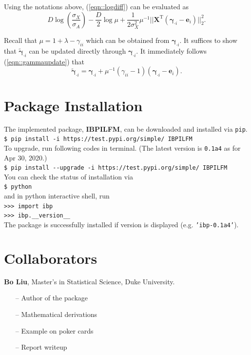 \documentclass{article}
\newcommand{\shellcmd}[1]{\\\indent\indent\texttt{\footnotesize\$ #1}\\}
\newcommand{\pythoncmd}[1]{\\\indent\indent\texttt{\footnotesize>{}>{}> #1}\\}
\begin{document}
\begin{appendices}
    Using the notations above, (\ref{eqn::logdiff}) can be evaluated as \begin{equation}D\log \left(\frac{\sigma_X}{\sigma_A}\right) - \frac{D}{2}\log \mu + \frac{1}{2\sigma_X^2}\mu^{-1}||{\mathbf{X}}^{\mathrm{T}}(\boldsymbol{\gamma}_{\cdot i} - \boldsymbol{e}_i)||_2^2.\end{equation}

    Recall that $\mu = 1 + \lambda - \gamma_{ii}$ which can be obtained from $\boldsymbol{\gamma}_{\cdot i}$. It suffices to show that $\widetilde{\boldsymbol{\gamma}}_{\cdot i}$ can be updated directly through $\boldsymbol{\gamma}_{\cdot i}$.
    It immediately follows (\ref{eqn::gammaupdate}) that \begin{equation}\widetilde{\boldsymbol{\gamma}}_{\cdot i} = \boldsymbol{\gamma}_{\cdot i} + \mu^{-1}(\gamma_{ii} - 1)(\boldsymbol{\gamma}_{\cdot i} - \boldsymbol{e}_i).\end{equation}
  \section{Package Installation}
      The implemented package, \textbf{IBPILFM}\citep{bolin}, can be downloaded and installed via \texttt{pip}.
      \vspace{0.3cm}
      \shellcmd{pip install -i https://test.pypi.org/simple/ IBPILFM\vspace{0.3cm}}
      To upgrade, run following codes in terminal. (The latest version is \texttt{0.1a4} as for Apr 30, 2020.)
      \vspace{0.3cm}
      \shellcmd{pip install -{}-upgrade -i https://test.pypi.org/simple/ IBPILFM\vspace{0.3cm}}
      You can check the status of installation via
      \vspace{0.3cm}
      \shellcmd{python\vspace{0.3cm}}
      and in python interactive shell, run
      \vspace{0.3cm}
      \pythoncmd{import ibp\\>{}>{}>{} ibp.\_\_version\_\_\vspace{0.3cm}}
      The package is successfully installed if version is displayed (e.g. \texttt{'ibp-0.1a4'}).

  \section{Collaborators}
      
      \textbf{Bo Liu}, Master's in Statistical Science, Duke University.
      \begin{itemize}[leftmargin = 7mm]
        \item[--] Author of the package
        \item[--] Mathematical derivations
        \item[--] Example on poker cards 
        \item[--] Report writeup 
      \end{itemize}


\end{appendices}
\end{document}
